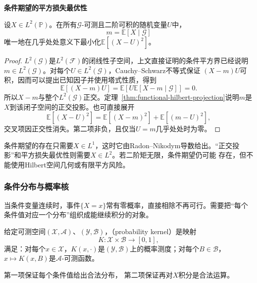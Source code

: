 \par\medskip\noindent\textbf{条件期望的平方损失最优性}\quad
\begin{theorem}[条件均值的平方损失最优性]
\label{thm:probability-conditional-mean-l2-projection}
设\(X\in L^2(\mathbb{P})\)。在所有\(\mathcal{G}\)-可测且二阶可积的随机变量\(U\)中，
\[ m=\mathbb{E}[X\mid\mathcal{G}] \]
唯一地在几乎处处意义下最小化\(\mathbb{E}[(X-U)^2]\)。
\end{theorem}

\begin{proof}
\(L^2(\mathcal{G})\)是\(L^2(\mathcal{F})\)的闭线性子空间，上文直接证明的条件平方界已经说明
\(m\in L^2(\mathcal{G})\)。对每个\(U\in L^2(\mathcal{G})\)，Cauchy--Schwarz不等式保证
\((X-m)U\)可积，因而可以提出已知因子并使用塔式性质，得到
\[ \mathbb{E}[(X-m)U]
  =\mathbb{E}\left[U\mathbb{E}[X-m\mid\mathcal{G}]\right]=0. \]
所以\(X-m\)与整个\(L^2(\mathcal{G})\)正交。定理~\ref{thm:functional-hilbert-projection}说明\(m\)是\(X\)到该闭子空间的正交投影。也可直接展开
\begin{equation}
  \mathbb{E}[(X-U)^2]
  =
  \mathbb{E}[(X-m)^2]
  +
  \mathbb{E}[(m-U)^2],
  \label{eq:probability-pythagorean-prediction}
\end{equation}
交叉项因正交性消失。第二项非负，且仅当\(U=m\)几乎处处时为零。
\end{proof}

条件期望的存在只需要\(X\in L^1\)，这时它由Radon--Nikodym导数给出。“正交投影”和平方损失最优性则需要\(X\in L^2\)。若二阶矩无限，条件期望仍可能
存在，但不能使用Hilbert空间几何或有限平方风险。


\subsubsection{条件分布与概率核}
\label{sec:rv-conditional-distribution}
当条件变量连续时，事件\(\{X=x\}\)常有零概率，直接相除不再可行。需要把“每个条件值对应一个分布”组织成能继续积分的对象。
\begin{definition}[概率核]
  \label{def:probability-kernel}
  给定可测空间\((\mathcal X,\mathcal A)\)、\((\mathcal Y,\mathcal B)\)，（probability kernel）是映射
  \[ K:\mathcal X\times\mathcal B\to[0,1], \]
  满足：对每个\(x\in\mathcal X\)，\(K(x,\cdot)\)是\((\mathcal Y,\mathcal B)\)上的概率测度；对每个\(B\in\mathcal B\)，\(x\mapsto K(x,B)\)是\(\mathcal A\)-可测函数。
\end{definition}
第一项保证每个条件值给出合法分布，
第二项保证再对\(X\)积分是合法运算。

